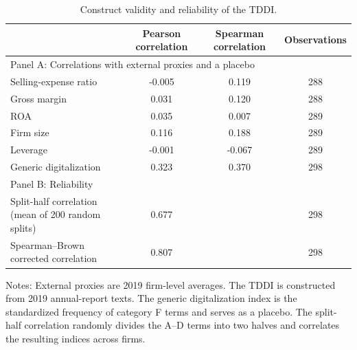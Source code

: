\begin{table}[htbp]
\centering
\small
\caption{Construct validity and reliability of the TDDI.}
\label{tab:validity}
\begin{threeparttable}
\begin{tabular}{lccc}
\toprule
 & Pearson correlation & Spearman correlation & Observations \\
\midrule
\multicolumn{4}{l}{Panel A: Correlations with external proxies and a placebo} \\
Selling-expense ratio & -0.005 & 0.119 & 288 \\
Gross margin & 0.031 & 0.120 & 288 \\
ROA & 0.035 & 0.007 & 289 \\
Firm size & 0.116 & 0.188 & 289 \\
Leverage & -0.001 & -0.067 & 289 \\
Generic digitalization & 0.323 & 0.370 & 298 \\
\midrule
\multicolumn{4}{l}{Panel B: Reliability} \\
Split-half correlation (mean of 200 random splits) & 0.677 & & 298 \\
Spearman--Brown corrected correlation & 0.807 & & 298 \\
\bottomrule
\end{tabular}
\begin{tablenotes}[flushleft]
\footnotesize
\item Notes: External proxies are 2019 firm-level averages. The TDDI is constructed from 2019 annual-report texts. The generic digitalization index is the standardized frequency of category F terms and serves as a placebo. The split-half correlation randomly divides the A--D terms into two halves and correlates the resulting indices across firms.
\end{tablenotes}
\end{threeparttable}
\end{table}
